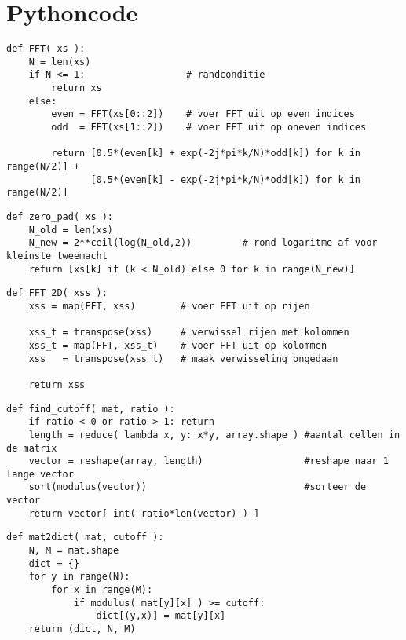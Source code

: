 \chapter{Pythoncode}
\label{muhappendix}

\begin{lstlisting}[label=fft,float=h!,caption={FFT algoritme in Python, voert de pseudocode uit zoals in sectie~\ref{fft_sec}}]
def FFT( xs ):
    N = len(xs)
    if N <= 1:                  # randconditie
        return xs
    else:
        even = FFT(xs[0::2])    # voer FFT uit op even indices
        odd  = FFT(xs[1::2])    # voer FFT uit op oneven indices

        return [0.5*(even[k] + exp(-2j*pi*k/N)*odd[k]) for k in range(N/2)] + 
               [0.5*(even[k] - exp(-2j*pi*k/N)*odd[k]) for k in range(N/2)]
\end{lstlisting}

\begin{lstlisting}[label=zeropad,float=h!,caption={Zero-padding algoritme in Python, voegt nullen toe tot een tweemacht is bereikt}]
def zero_pad( xs ):
    N_old = len(xs)
    N_new = 2**ceil(log(N_old,2))         # rond logaritme af voor kleinste tweemacht
    return [xs[k] if (k < N_old) else 0 for k in range(N_new)]
\end{lstlisting}

\begin{lstlisting}[label=fft2d,float=h!,caption=2-Dimensionaal FFT algoritme]
def FFT_2D( xss ):
    xss = map(FFT, xss)        # voer FFT uit op rijen

    xss_t = transpose(xss)     # verwissel rijen met kolommen
    xss_t = map(FFT, xss_t)    # voer FFT uit op kolommen
    xss   = transpose(xss_t)   # maak verwisseling ongedaan 

    return xss
\end{lstlisting}

\begin{lstlisting}[label=cutoff,float=h!,caption=Het vinden van een goede cutoff-waarde gegeven een gewenst compressieniveau]
def find_cutoff( mat, ratio ):
	if ratio < 0 or ratio > 1: return
	length = reduce( lambda x, y: x*y, array.shape ) #aantal cellen in de matrix 
	vector = reshape(array, length) 				 #reshape naar 1 lange vector
	sort(modulus(vector)) 							 #sorteer de vector
	return vector[ int( ratio*len(vector) ) ]
\end{lstlisting}

\begin{lstlisting}[label=mat2dict,float=h!,caption=Matrix naar dictionary conversie]
def mat2dict( mat, cutoff ):
	N, M = mat.shape
	dict = {}
	for y in range(N):
		for x in range(M):
			if modulus( mat[y][x] ) >= cutoff:
				dict[(y,x)] = mat[y][x]
	return (dict, N, M)
\end{lstlisting}

